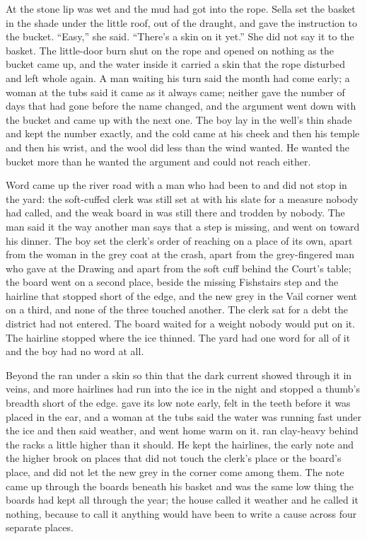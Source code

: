 At  the stone lip was wet and the mud had got into the rope. Sella set the basket in the shade under the little roof, out of the draught, and gave the instruction to the bucket. “Easy,” she said. “There's a skin on it yet.” She did not say it to the basket. The little-door burn shut on the rope and opened on nothing as the bucket came up, and the water inside it carried a skin that the rope disturbed and left whole again. A man waiting his turn said the month had come early; a woman at the tubs said it came as it always came; neither gave the number of days that had gone before the name changed, and the argument went down with the bucket and came up with the next one. The boy lay in the well's thin shade and kept the number exactly, and the cold came at his cheek and then his temple and then his wrist, and the wool did less than the wind wanted. He wanted the bucket more than he wanted the argument and could not reach either.

Word came up the river road with a man who had been to  and did not stop in the yard: the soft-cuffed clerk was still set at  with his slate for a measure nobody had called, and the weak board in  was still there and trodden by nobody. The man said it the way another man says that a step is missing, and went on toward his dinner. The boy set the clerk's order of reaching on a place of its own, apart from the woman in the grey coat at the crash, apart from the grey-fingered man who gave at the Drawing and apart from the soft cuff behind the Court's table; the board went on a second place, beside the missing Fishstairs step and the hairline that stopped short of the edge, and the new grey in the Vail corner went on a third, and none of the three touched another. The clerk sat for a debt the district had not entered. The board waited for a weight nobody would put on it. The hairline stopped where the ice thinned. The yard had one word for all of it and the boy had no word at all.

Beyond  the  ran under a skin so thin that the dark current showed through it in veins, and more hairlines had run into the ice in the night and stopped a thumb's breadth short of the edge.  gave its low note early, felt in the teeth before it was placed in the ear, and a woman at the tubs said the water was running fast under the ice and then said weather, and went home warm on it.  ran clay-heavy behind the racks a little higher than it should. He kept the hairlines, the early note and the higher brook on places that did not touch the clerk's place or the board's place, and did not let the new grey in the corner come among them. The note came up through the boards beneath his basket and was the same low thing the boards had kept all through the year; the house called it weather and he called it nothing, because to call it anything would have been to write a cause across four separate places.

